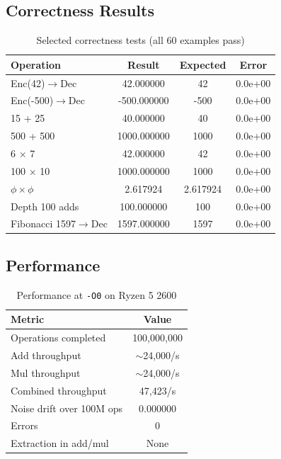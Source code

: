 \documentclass[11pt,a4paper]{article}
\theoremstyle{remark}
\begin{document}
\subsection{Correctness Results}

\begin{table}[H]
\centering
\begin{tabular}{lccc}
\toprule
\textbf{Operation} & \textbf{Result} & \textbf{Expected} & \textbf{Error} \\
\midrule
Enc(42)$\to$Dec & 42.000000 & 42 & 0.0e+00 \\
Enc(-500)$\to$Dec & -500.000000 & -500 & 0.0e+00 \\
15 + 25 & 40.000000 & 40 & 0.0e+00 \\
500 + 500 & 1000.000000 & 1000 & 0.0e+00 \\
6 $\times$ 7 & 42.000000 & 42 & 0.0e+00 \\
100 $\times$ 10 & 1000.000000 & 1000 & 0.0e+00 \\
$\phi \times \phi$ & 2.617924 & 2.617924 & 0.0e+00 \\
Depth 100 adds & 100.000000 & 100 & 0.0e+00 \\
Fibonacci 1597$\to$Dec & 1597.000000 & 1597 & 0.0e+00 \\
\bottomrule
\end{tabular}
\caption{Selected correctness tests (all 60 examples pass)}
\end{table}

\subsection{Performance}

\begin{table}[H]
\centering
\begin{tabular}{lc}
\toprule
\textbf{Metric} & \textbf{Value} \\
\midrule
Operations completed & 100,000,000 \\
Add throughput & $\sim$24,000/s \\
Mul throughput & $\sim$24,000/s \\
Combined throughput & 47,423/s \\
Noise drift over 100M ops & 0.000000 \\
Errors & 0 \\
Extraction in add/mul & None \\
\bottomrule
\end{tabular}
\caption{Performance at \texttt{-O0} on Ryzen 5 2600}
\end{table}
\end{document}
